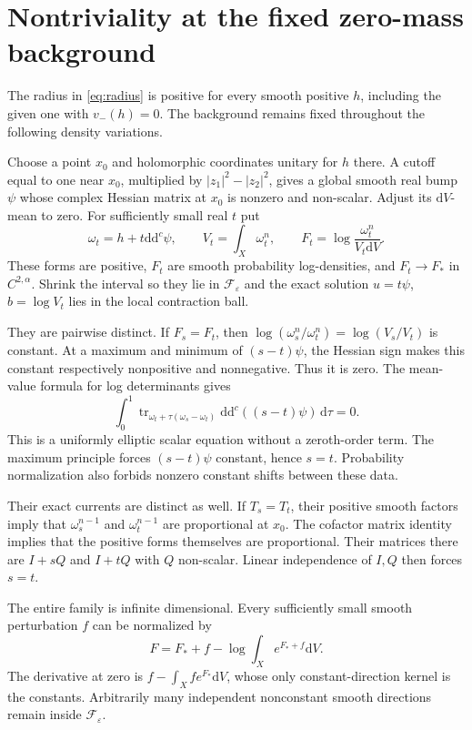 \documentclass[11pt]{article}
\newcommand{\ddc}{\mathrm{d}\mathrm{d}^c}
\newcommand{\eps}{\varepsilon}
\begin{document}
\section{Nontriviality at the fixed zero-mass background}

The radius in \eqref{eq:radius} is positive for every smooth positive
$h$, including the given one with $v_-(h)=0$. The background remains
fixed throughout the following density variations.

Choose a point $x_0$ and holomorphic coordinates unitary for $h$ there.
A cutoff equal to one near $x_0$, multiplied by
$|z_1|^2-|z_2|^2$, gives a global smooth real bump $\psi$ whose
complex Hessian matrix at $x_0$ is nonzero and non-scalar. Adjust its
$\mathrm dV$-mean to zero. For sufficiently small real $t$ put
\[
 \omega_t=h+t\ddc\psi,\qquad V_t=\int_X\omega_t^n,
 \qquad F_t=\log\frac{\omega_t^n}{V_t\mathrm dV}.
\]
These forms are positive, $F_t$ are smooth probability log-densities,
and $F_t\to F_*$ in $C^{2,\alpha}$. Shrink the interval so they lie
in $\mathcal F_\eps$ and the exact solution
$u=t\psi$, $b=\log V_t$ lies in the local contraction ball.

They are pairwise distinct. If $F_s=F_t$, then
$\log(\omega_s^n/\omega_t^n)=\log(V_s/V_t)$ is constant.
At a maximum and minimum of $(s-t)\psi$, the Hessian sign makes this
constant respectively nonpositive and nonnegative. Thus it is zero.
The mean-value formula for log determinants gives
\[
 \int_0^1\operatorname{tr}_{\omega_t+\tau(\omega_s-\omega_t)}
                          \ddc((s-t)\psi)\,\mathrm d\tau=0.
\]
This is a uniformly elliptic scalar equation without a zeroth-order
term. The maximum principle forces $(s-t)\psi$ constant, hence $s=t$.
Probability normalization also forbids nonzero constant shifts between
these data.

Their exact currents are distinct as well. If $T_s=T_t$, their positive
smooth factors imply that $\omega_s^{n-1}$ and $\omega_t^{n-1}$ are
proportional at $x_0$. The cofactor matrix identity implies that the
positive forms themselves are proportional. Their matrices there are
$I+sQ$ and $I+tQ$ with $Q$ non-scalar. Linear independence of $I,Q$
then forces $s=t$.

The entire family is infinite dimensional. Every sufficiently small
smooth perturbation $f$ can be normalized by
\[
 F=F_*+f-\log\int_Xe^{F_*+f}\mathrm dV.
\]
The derivative at zero is $f-\int_Xf e^{F_*}\mathrm dV$, whose only
constant-direction kernel is the constants. Arbitrarily many independent
nonconstant smooth directions remain inside $\mathcal F_\eps$.
\end{document}
